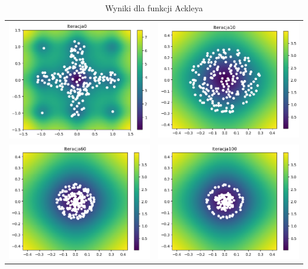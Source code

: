 \begin{table}[H]
    \centering
    \caption{Wyniki dla funkcji Ackleya}
    \begin{tabular}{cc}
         \includegraphics[width=0.5\linewidth]{figures/3d/it0.png} & \includegraphics[width=0.5\linewidth]{figures/3d/it10.png} \\
         \includegraphics[width=0.5\linewidth]{figures/3d/it60.png} & 
         \includegraphics[width=0.5\linewidth]{figures/3d/it100.png} \\

\end{tabular}
\end{table}
